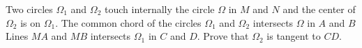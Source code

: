 Two circles $\Omega_{1}$ and $\Omega_{2}$ touch internally the circle
$\Omega$ in $M$ and $N$ and the center of $\Omega_{2}$ is on $\Omega_{1}$.
The common chord of the circles $\Omega_{1}$ and $\Omega_{2}$
intersects $\Omega$ in $A$ and $B$
Lines $MA$ and $MB$ intersects $\Omega_{1}$ in $C$ and $D$.
Prove that $\Omega_{2}$ is tangent to $CD$.